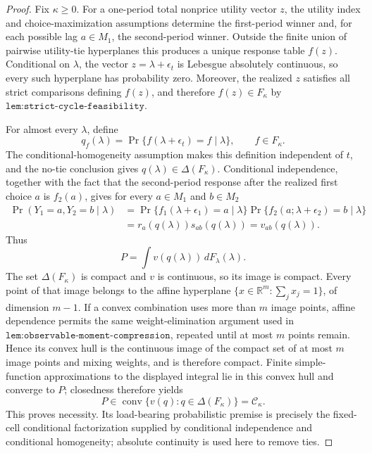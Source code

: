 \documentclass{article}
\begin{document}
\begin{proof}
Fix \(\kappa\ge0\).  For a one-period total nonprice utility vector \(z\), the utility index and choice-maximization assumptions determine the first-period winner and, for each possible lag \(a\in M_1\), the second-period winner.  Outside the finite union of pairwise utility-tie hyperplanes this produces a unique response table \(f(z)\).  Conditional on \(\lambda\), the vector \(z=\lambda+\epsilon_t\) is Lebesgue absolutely continuous, so every such hyperplane has probability zero.  Moreover, the realized \(z\) satisfies all strict comparisons defining \(f(z)\), and therefore \(f(z)\in F_\kappa\) by \(\texttt{lem:strict-cycle-feasibility}\).

For almost every \(\lambda\), define
\[
 q_f(\lambda)
 =\Pr\{f(\lambda+\epsilon_t)=f\mid\lambda\},
 \qquad f\in F_\kappa.
\]
The conditional-homogeneity assumption makes this definition independent of \(t\), and the no-tie conclusion gives \(q(\lambda)\in\Delta(F_\kappa)\).  Conditional independence, together with the fact that the second-period response after the realized first choice \(a\) is \(f_2(a)\), gives for every \(a\in M_1\) and \(b\in M_2\)
\[
 \begin{aligned}
 \Pr(Y_1=a,Y_2=b\mid\lambda)
 &=\Pr\{f_1(\lambda+\epsilon_1)=a\mid\lambda\}
   \Pr\{f_2(a;\lambda+\epsilon_2)=b\mid\lambda\}\\
 &=r_a(q(\lambda))s_{ab}(q(\lambda))
 =v_{ab}(q(\lambda)).
 \end{aligned}
\]
Thus
\[
 P=\int v(q(\lambda))\,dF_\lambda(\lambda).
\]
The set \(\Delta(F_\kappa)\) is compact and \(v\) is continuous, so its image is compact.  Every point of that image belongs to the affine hyperplane \(\{x\in\mathbb R^m:\sum_jx_j=1\}\), of dimension \(m-1\).  If a convex combination uses more than \(m\) image points, affine dependence permits the same weight-elimination argument used in \(\texttt{lem:observable-moment-compression}\), repeated until at most \(m\) points remain.  Hence its convex hull is the continuous image of the compact set of at most \(m\) image points and mixing weights, and is therefore compact.  Finite simple-function approximations to the displayed integral lie in this convex hull and converge to \(P\); closedness therefore yields
\[
 P\in\operatorname{conv}\{v(q):q\in\Delta(F_\kappa)\}=\mathcal C_\kappa.
\]
This proves necessity.  Its load-bearing probabilistic premise is precisely the fixed-cell conditional factorization supplied by conditional independence and conditional homogeneity; absolute continuity is used here to remove ties.


\end{proof}
\end{document}
